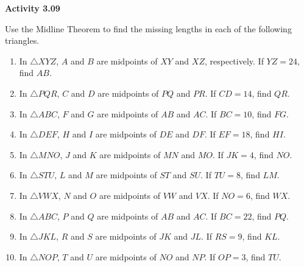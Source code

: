 \vspace{0.3ex}
\noindent\textbf{Activity 3.09}

\vspace{0.2ex}

Use the Midline Theorem to find the missing lengths in each of the following triangles.
\begin{enumerate}[label=\color{blue}\arabic*.]
    \item In \(\bigtriangleup XYZ\), \(A\) and \(B\) are midpoints of \(XY\) and \(XZ\), respectively. If \(YZ = 24\), find \(AB\).
    \item In \(\bigtriangleup PQR\), \(C\) and \(D\) are midpoints of \(PQ\) and \(PR\). If \(CD = 14\), find \(QR\).
    \item In \(\bigtriangleup ABC\), \(F\) and \(G\) are midpoints of \(AB\) and \(AC\). If \(BC = 10\), find \(FG\).
    \item In \(\bigtriangleup DEF\), \(H\) and \(I\) are midpoints of \(DE\) and \(DF\). If \(EF = 18\), find \(HI\).
    \item In \(\bigtriangleup MNO\), \(J\) and \(K\) are midpoints of \(MN\) and \(MO\). If \(JK = 4\), find \(NO\).
    \item In \(\bigtriangleup STU\), \(L\) and \(M\) are midpoints of \(ST\) and \(SU\). If \(TU = 8\), find \(LM\).
    \item In \(\bigtriangleup VWX\), \(N\) and \(O\) are midpoints of \(VW\) and \(VX\). If \(NO = 6\), find \(WX\).
    \item In \(\bigtriangleup ABC\), \(P\) and \(Q\) are midpoints of \(AB\) and \(AC\). If \(BC = 22\), find \(PQ\).
    \item In \(\bigtriangleup JKL\), \(R\) and \(S\) are midpoints of \(JK\) and \(JL\). If \(RS = 9\), find \(KL\).
    \item In \(\bigtriangleup NOP\), \(T\) and \(U\) are midpoints of \(NO\) and \(NP\). If \(OP = 3\), find \(TU\).
\end{enumerate}
